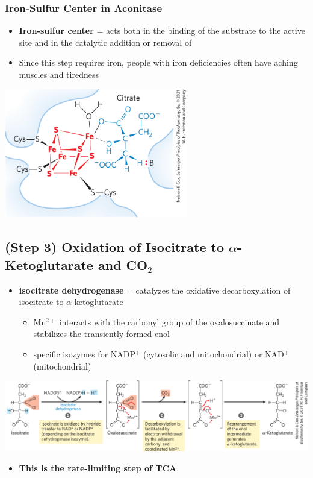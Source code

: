\documentclass[10pt]{article}
\newcommand{\water}{\text{H$_2$O}}
\begin{document}
\subsubsection*{Iron-Sulfur Center in Aconitase}
\begin{itemize}
	\item \textbf{Iron-sulfur center} = acts both in the binding of the substrate to the active site and in the catalytic addition or removal of \water
	\item Since this step requires iron, people with iron deficiencies often have aching muscles and tiredness
\end{itemize}
\begin{center} 
	\includegraphics*[width=0.6\textwidth]{L4_5.png} 
\end{center}

\subsection*{(Step 3) Oxidation of Isocitrate to $\alpha$-Ketoglutarate and CO$_2$}
\begin{itemize}
	\item \textbf{isocitrate dehydrogenase} = catalyzes the oxidative decarboxylation of isocitrate to $\alpha$-ketoglutarate
	\begin{itemize}
        \item Mn$^{2+}$ interacts with the carbonyl group of the oxalosuccinate and stabilizes the transiently-formed enol
        \item specific isozymes for NADP$^+$ (cytosolic and mitochondrial) or NAD$^+$ (mitochondrial)
    \end{itemize}
\end{itemize}
\begin{center} 
	\includegraphics*[width=\textwidth]{L4_6.png} 
\end{center}
\begin{itemize}
	\item \textbf{This is the rate-limiting step of TCA}
\end{itemize}
\end{document}
